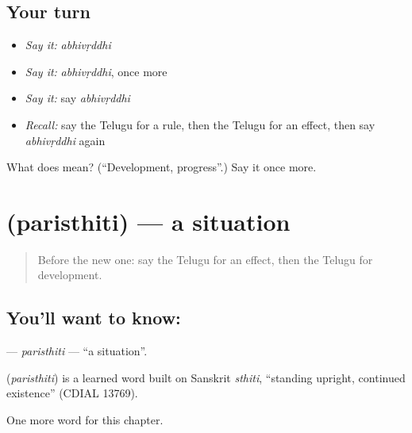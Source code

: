 \subsection*{Your turn}
\begin{itemize}
\raggedright
  \item \emph{Say it:} \emph{abhivṛddhi}
  \item \emph{Say it:} \emph{abhivṛddhi}, once more
  \item \emph{Say it:} say \emph{abhivṛddhi}
  \item \emph{Recall:} say the Telugu for a rule, then the Telugu for an effect, then say \emph{abhivṛddhi} again
\end{itemize}

\begin{tcolorbox}[breakable,colback=teal!4,colframe=teal!35!black,title={Before you move on}]
What does  mean? (\textquotedblleft{}Development, progress\textquotedblright{}.) Say it once more.
\end{tcolorbox}
\section[\texorpdfstring{\te{పరిస్థితి} (paristhiti)}{పరిస్థితి (paristhiti)}]{ (paristhiti) — a situation}

\label{lesson:TE-C258-paristhiti}



\begin{quote}
Before the new one: say the Telugu for an effect, then the Telugu for development.
\end{quote}

\subsection*{You'll want to know: }
\textbf{} — \emph{paristhiti} — \textquotedblleft{}a situation\textquotedblright{}.

\begin{cousinweb}
\textbf{} (\emph{paristhiti}) is a learned word built on Sanskrit \emph{sthiti}, \textquotedblleft{}standing upright, continued existence\textquotedblright{} (CDIAL 13769).
\end{cousinweb}

\begin{grammarlens}[title={What you've built}]
One more word for this chapter.
\end{grammarlens}

